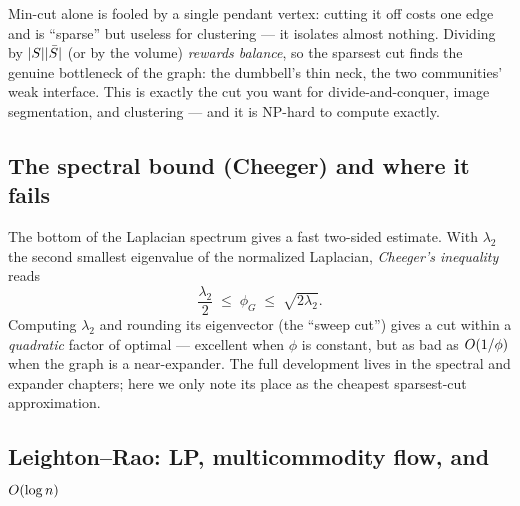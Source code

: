\begin{intuitionbox}
Min-cut alone is fooled by a single pendant vertex: cutting it off costs one edge and is ``sparse''
but useless for clustering --- it isolates almost nothing. Dividing by $\lvert S\rvert\lvert\bar S\rvert$ (or by the
volume) \emph{rewards balance}, so the sparsest cut finds the genuine bottleneck of the graph: the
dumbbell's thin neck, the two communities' weak interface. This is exactly the cut you want for
divide-and-conquer, image segmentation, and clustering --- and it is \textsf{NP}-hard to compute
exactly.
\end{intuitionbox}

\begin{center}
\end{center}

\subsection{The spectral bound (Cheeger) and where it fails}

The bottom of the Laplacian spectrum gives a fast two-sided estimate. With $\lambda_2$ the second
smallest eigenvalue of the normalized Laplacian, \emph{Cheeger's inequality} reads
\[
  \frac{\lambda_2}{2} \;\le\; \phi_G \;\le\; \sqrt{2\lambda_2}.
\]
Computing $\lambda_2$ and rounding its eigenvector (the ``sweep cut'') gives a cut within a
\emph{quadratic} factor of optimal --- excellent when $\phi$ is constant, but as bad as $O(1/\phi)$
when the graph is a near-expander. The full development lives in the spectral and expander chapters;
here we only note its place as the cheapest sparsest-cut approximation.

\subsection{Leighton--Rao: LP, multicommodity flow, and $O(\log n)$}

